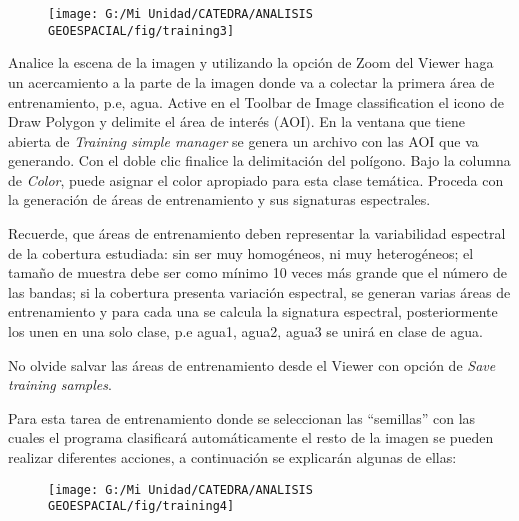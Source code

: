 \documentclass[a4paper,oneside,11pt,]{article}
\begin{document}
\begin{figure}
\centering
\texttt{[image: G:/Mi Unidad/CATEDRA/ANALISIS GEOESPACIAL/fig/training3]}
\end{figure}

Analice la escena de la imagen y utilizando la opción de Zoom del Viewer haga un acercamiento a la parte de la imagen donde va a colectar la primera área de entrenamiento, p.e, agua. Active en el Toolbar de Image classification el icono de Draw Polygon   y delimite el área de interés (AOI). En la ventana que tiene abierta de \emph{Training simple manager} se genera un archivo con las AOI que va generando. Con el doble clic  finalice la delimitación del polígono. Bajo la columna de \emph{Color}, puede asignar el color apropiado para esta clase temática. Proceda con la generación de áreas de entrenamiento y sus signaturas espectrales. 
\par Recuerde, que áreas de entrenamiento deben representar la variabilidad espectral de la cobertura estudiada: sin ser muy homogéneos, ni muy heterogéneos; el tamaño de muestra debe ser como mínimo 10 veces más grande que el número de las bandas; si la cobertura presenta variación espectral, se generan varias áreas de entrenamiento y para cada una se calcula la signatura espectral,  posteriormente los unen en una solo clase, p.e agua1, agua2, agua3 se unirá en clase de agua.
\par No olvide salvar las áreas de entrenamiento desde el Viewer con opción de \emph{Save training samples}.
\par Para esta tarea de entrenamiento donde se seleccionan las “semillas” con las cuales el programa clasificará automáticamente el resto de la imagen se pueden realizar diferentes acciones, a continuación se explicarán algunas de ellas:

\begin{figure}
\centering
\texttt{[image: G:/Mi Unidad/CATEDRA/ANALISIS GEOESPACIAL/fig/training4]}
\end{figure}
\end{document}
